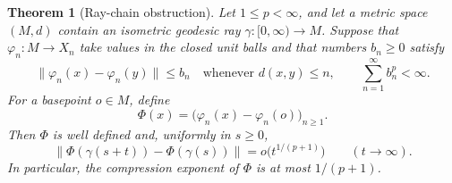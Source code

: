 \documentclass[11pt]{article}
\newtheorem{theorem}{Theorem}
\begin{document}
\begin{theorem}[Ray-chain obstruction]\label{thm:obstruction}
Let $1\le p<\infty$, and let a metric space $(M,d)$ contain an isometric
geodesic ray $\gamma:[0,\infty)\to M$.  Suppose that
$\varphi_n:M\to X_n$ take values in the closed unit balls and that numbers
$b_n\ge0$ satisfy
\begin{equation}\label{eq:local}
 \|\varphi_n(x)-\varphi_n(y)\|\le b_n
 \quad\text{whenever }d(x,y)\le n,
 \qquad \sum_{n=1}^{\infty}b_n^p<\infty.
\end{equation}
For a basepoint $o\in M$, define
\[
 \Phi(x)=\bigl(\varphi_n(x)-\varphi_n(o)\bigr)_{n\ge1}.
\]
Then $\Phi$ is well defined and, uniformly in $s\ge0$,
\begin{equation}\label{eq:little-o}
 \|\Phi(\gamma(s+t))-\Phi(\gamma(s))\|
 =o\bigl(t^{1/(p+1)}\bigr)\qquad(t\to\infty).
\end{equation}
In particular, the compression exponent of $\Phi$ is at most $1/(p+1)$.
\end{theorem}
\end{document}
